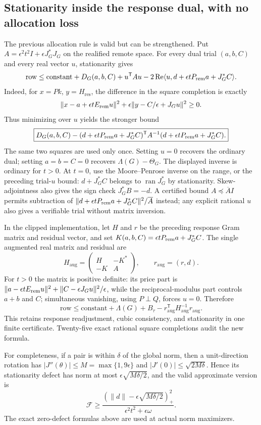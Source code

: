 \subsection{Stationarity inside the response dual, with no allocation loss}
The previous allocation rule is valid but can be strengthened. Put
$A=\epsilon^2t^2I+\epsilon J_G^*J_G$ on the realified remote space.
For every dual trial $(a,b,C)$ and every real vector $u$, stationarity gives
\[
 \text{row}\le\text{constant}+D_G(a,b,C)+u^{\mathsf T}Au
       -2\operatorname{Re}\langle u,d+\epsilon t P_{\rm rem}a+J_G^*C\rangle.
\]
Indeed, for $x=Pk$, $y=H_{\mathrm{res}}$, the difference in the square
completion is exactly
\[
 \|x-a+\epsilon t E_{\rm rem}u\|^2+
 \epsilon\|y-C/\epsilon+J_Gu\|^2\ge0.
\]
Thus minimizing over $u$ yields the stronger bound
\[
 \boxed{D_G(a,b,C)
 -(d+\epsilon t P_{\rm rem}a+J_G^*C)^{\mathsf T}A^{-1}
                  (d+\epsilon t P_{\rm rem}a+J_G^*C).}
\]
The same two squares are used only once. Setting $u=0$ recovers the ordinary
dual; setting $a=b=C=0$ recovers $\Lambda(G)-\Theta_G$.
The displayed inverse is ordinary for $t>0$. At $t=0$, use the
Moore--Penrose inverse on the range, or the preceding trial-$u$ bound:
$d+J_G^*C$ belongs to $\operatorname{ran}J_G^*$ by stationarity.
Skew-adjointness also gives the sign check $J_G^*B=-d$.
A certified bound $A\preceq\overline A I$ permits subtraction of
$\|d+\epsilon t P_{\rm rem}a+J_G^*C\|^2/\overline A$ instead; any explicit rational
$u$ also gives a verifiable trial without matrix inversion.

In the clipped implementation, let $H$ and $r$ be the preceding response
Gram matrix and residual vector, and set $K(a,b,C)=\epsilon t P_{\rm rem}a+J_G^*C$.
The single augmented real matrix and residual are
\[
 H_{\mathrm{aug}}=\begin{pmatrix}H&-K^*\\-K&A\end{pmatrix},
 \qquad r_{\mathrm{aug}}=(r,d).
\]
For $t>0$ the matrix is positive definite: its price part is
$\|a-\epsilon t E_{\rm rem}u\|^2+\|C-\epsilon J_Gu\|^2/\epsilon$, while the
reciprocal-modulus part controls $a+b$ and $C$; simultaneous vanishing,
using $P\perp Q$, forces $u=0$. Therefore
\[
 \text{row}\le\text{constant}+\Lambda(G)+B_\tau
       -r_{\mathrm{aug}}^{\mathsf T}H_{\mathrm{aug}}^{-1}r_{\mathrm{aug}}.
\]
This retains response readjustment, cubic consistency, and stationarity in
one finite certificate. Twenty-five exact rational square completions audit
the new formula.

For completeness, if a pair is within $\delta$ of the global norm, then a
unit-direction rotation has $|J''(\theta)|\le M=\max\{1,9\epsilon\}$ and
$|J'(0)|\le\sqrt{2M\delta}$. Hence its stationarity defect has norm at most
$\epsilon\sqrt{M\delta/2}$, and the valid approximate version is
\[
 \mathcal F\ge
 \frac{(\|d\|-\epsilon\sqrt{M\delta/2})_+^2}
 {\epsilon^2t^2+\epsilon\omega}.
\]
The exact zero-defect formulas above are used at actual norm maximizers.


